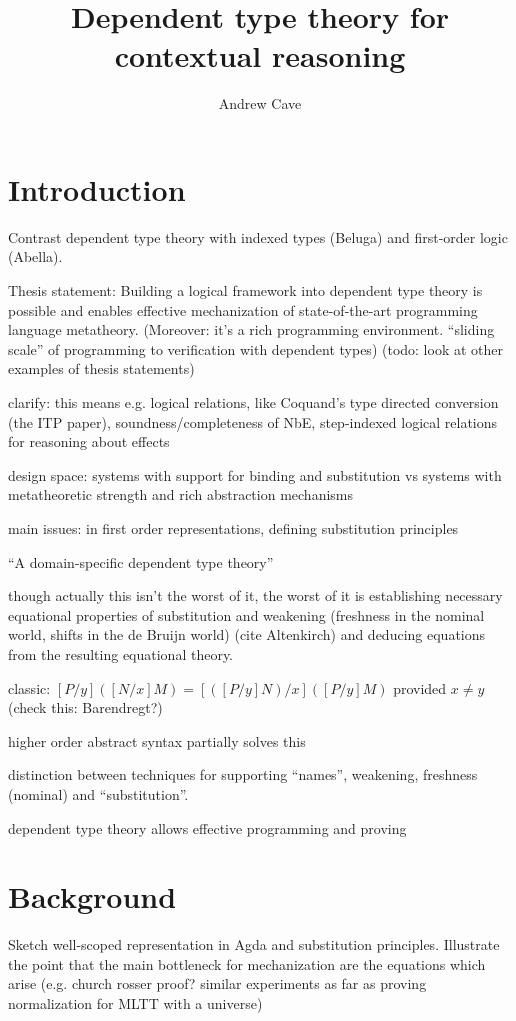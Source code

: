 \documentclass{article}
\author{Andrew Cave}
\title{Dependent type theory for contextual reasoning}
\begin{document}
\maketitle

\section{Introduction}
Contrast dependent type theory with indexed types (Beluga) and first-order
logic (Abella).

Thesis statement: Building a logical framework into dependent type
theory is possible and enables effective mechanization of state-of-the-art programming
language metatheory. (Moreover: it's a rich programming
environment. ``sliding scale'' of programming to verification with dependent types)
(todo: look at other examples of thesis statements)

clarify: this means e.g. logical relations, like Coquand's type
directed conversion (the ITP paper), soundness/completeness of NbE,
step-indexed logical relations for reasoning about effects

design space: systems with support for binding and substitution vs
systems with metatheoretic strength and rich abstraction mechanisms

main issues:
in first order representations, defining substitution principles

``A domain-specific dependent type theory''

though actually this isn't the worst of it, the worst of it is
establishing necessary equational properties of substitution and weakening
(freshness in the nominal world, shifts in the de Bruijn world) (cite
Altenkirch) and deducing equations from the resulting equational
theory.

classic: $[P/y]([N/x]M) = [([P/y]N)/x] ([P/y]M)$ provided $x\neq y$
(check this: Barendregt?)

higher order abstract syntax partially solves this

distinction between techniques for supporting ``names'', weakening, freshness (nominal) and ``substitution''.

dependent type theory allows effective programming and proving
\section{Background}
Sketch well-scoped representation in Agda and substitution
principles. Illustrate the point that the main bottleneck for
mechanization are the equations which arise (e.g. church rosser proof?
similar experiments as far as proving normalization for MLTT with a universe)
\end{document}
